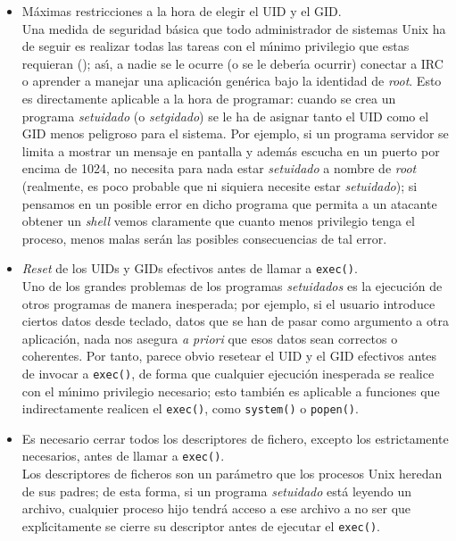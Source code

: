 \begin{itemize}
\item M\'aximas restricciones a la hora de elegir el UID y el GID.\\
Una medida de seguridad b\'asica que todo administrador de sistemas Unix ha
de seguir es realizar todas las tareas con el m\'{\i}nimo privilegio que estas
requieran (\cite{kn:sim90}); as\'{\i}, a nadie se le ocurre (o se le 
deber\'{\i}a ocurrir) 
conectar a IRC o aprender a manejar una aplicaci\'on gen\'erica bajo la 
identidad de {\it root}.  Esto es directamente aplicable a la hora de programar:
cuando se crea un programa {\it setuidado} (o {\it setgidado}) se le ha de
asignar tanto el UID como el GID menos peligroso para el sistema. Por ejemplo,
si un programa servidor se limita a mostrar un mensaje en pantalla y adem\'as 
escucha en un puerto por encima de 1024, no necesita para nada estar {\it
setuidado} a nombre de {\it root} (realmente, es poco probable que ni siquiera
necesite estar {\it setuidado}); si pensamos en un posible error en dicho 
programa que permita a un atacante obtener un {\it shell} vemos claramente
que cuanto menos privilegio tenga el proceso, menos malas ser\'an las posibles
consecuencias de tal error.
\item {\it Reset} de los UIDs y GIDs efectivos antes de llamar a {\tt exec()}.\\
Uno de los grandes problemas de los programas {\it setuidados} es la 
ejecuci\'on de otros programas de manera inesperada; por ejemplo, si el usuario
introduce ciertos datos desde teclado, datos que se han de pasar como argumento
a otra aplicaci\'on, nada nos asegura {\it a priori} que esos datos sean 
correctos o coherentes. Por tanto, parece obvio resetear el UID y el GID 
efectivos antes de invocar a {\tt exec()}, de forma que cualquier ejecuci\'on
inesperada se realice con el m\'{\i}nimo privilegio necesario; esto tambi\'en
es aplicable a funciones que indirectamente realicen el {\tt exec()}, como
{\tt system()} o {\tt popen()}.
\item Es necesario cerrar todos los descriptores de fichero, excepto los 
estrictamente necesarios, antes de llamar a {\tt exec()}.\\
Los descriptores de ficheros son un par\'ametro que los procesos Unix heredan
de sus padres; de esta forma, si un programa {\it setuidado} est\'a leyendo
un archivo, cualquier proceso hijo tendr\'a acceso a ese archivo a no ser que
expl\'{\i}citamente se cierre su descriptor antes de ejecutar el {\tt exec()}.\\

\end{itemize}
